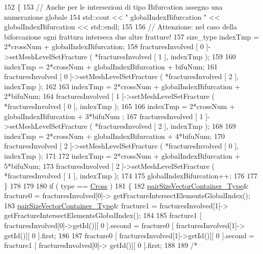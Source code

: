 \begin{DoxyCode}
152            \{
153                \textcolor{comment}{// Anche per le intersezioni di tipo Bifurcation assegno una numerazione globale}
154                std::cout << \textcolor{stringliteral}{" globalIndexBifurcation "} << globalIndexBifurcation << std::endl;
155                
156                \textcolor{comment}{// Attenzione: nel caso della biforcazione ogni frattura interseca due altre fratture!}
157                size\_type indexTmp = 2*crossNum + globalIndexBifurcation;
158                fracturesInvolved [ 0 ]->setMeshLevelSetFracture ( *fracturesInvolved [ 1 ], indexTmp );
159                
160                indexTmp = 2*crossNum + globalIndexBifurcation + bifuNum;
161                fracturesInvolved [ 0 ]->setMeshLevelSetFracture ( *fracturesInvolved [ 2 ], indexTmp );
162 
163                indexTmp = 2*crossNum + globalIndexBifurcation + 2*bifuNum;
164                fracturesInvolved [ 1 ]->setMeshLevelSetFracture ( *fracturesInvolved [ 0 ], indexTmp );
165                
166                indexTmp = 2*crossNum + globalIndexBifurcation + 3*bifuNum ;
167                fracturesInvolved [ 1 ]->setMeshLevelSetFracture ( *fracturesInvolved [ 2 ], indexTmp );
168 
169                indexTmp = 2*crossNum + globalIndexBifurcation + 4*bifuNum;
170                fracturesInvolved [ 2 ]->setMeshLevelSetFracture ( *fracturesInvolved [ 0 ], indexTmp );
171                
172                indexTmp = 2*crossNum + globalIndexBifurcation + 5*bifuNum;
173                fracturesInvolved [ 2 ]->setMeshLevelSetFracture ( *fracturesInvolved [ 1 ], indexTmp );
174 
175                globalIndexBifurcation++;
176 
177            \}
178 
179         
180            \textcolor{keywordflow}{if} ( type == \hyperlink{classFractureIntersect_a9a4e4a784fa4c8e359767ed543f89dc5a743fef1af81c0e61412fafb9438b380e}{Cross} )
181            \{
182                \hyperlink{Core_8h_a9bc476e433f99b82a9c2b8560735c7b5}{pairSizeVectorContainer\_Type}& fracture0 = fracturesInvolved[0]->
      getFractureIntersectElementsGlobalIndex();
183                \hyperlink{Core_8h_a9bc476e433f99b82a9c2b8560735c7b5}{pairSizeVectorContainer\_Type}& fracture1 = fracturesInvolved[1]->
      getFractureIntersectElementsGlobalIndex();
184                 
185                 fracture1 [ fracturesInvolved[0]->getId()][ 0 ].second = fracture0 [ fracturesInvolved[1]->
      getId()][ 0 ].first;
186     
187                 fracture0 [ fracturesInvolved[1]->getId()][ 0 ].second = fracture1 [ fracturesInvolved[0]->
      getId()][ 0 ].first;
188                 
189                 \textcolor{comment}{/*}

\end{DoxyCode}
